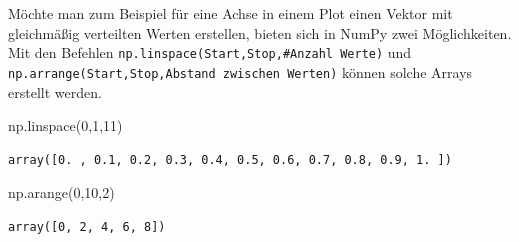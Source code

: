 \documentclass[
  letterpaper,
  DIV=11,
  numbers=noendperiod]{scrreprt}
\newenvironment{Shaded}{\begin{snugshade}}{\end{snugshade}}
\newcommand{\DecValTok}[1]{\textcolor[rgb]{0.68,0.00,0.00}{#1}}
\newcommand{\NormalTok}[1]{\textcolor[rgb]{0.00,0.23,0.31}{#1}}
\begin{document}
Möchte man zum Beispiel für eine Achse in einem Plot einen Vektor mit
gleichmäßig verteilten Werten erstellen, bieten sich in NumPy zwei
Möglichkeiten. Mit den Befehlen
\texttt{np.linspace(Start,Stop,\#Anzahl\ Werte)} und
\texttt{np.arrange(Start,Stop,Abstand\ zwischen\ Werten)} können solche
Arrays erstellt werden.

\begin{Shaded}
\begin{Highlighting}[]
\NormalTok{np.linspace(}\DecValTok{0}\NormalTok{,}\DecValTok{1}\NormalTok{,}\DecValTok{11}\NormalTok{)}
\end{Highlighting}
\end{Shaded}

\begin{verbatim}
array([0. , 0.1, 0.2, 0.3, 0.4, 0.5, 0.6, 0.7, 0.8, 0.9, 1. ])
\end{verbatim}

\begin{Shaded}
\begin{Highlighting}[]
\NormalTok{np.arange(}\DecValTok{0}\NormalTok{,}\DecValTok{10}\NormalTok{,}\DecValTok{2}\NormalTok{)}
\end{Highlighting}
\end{Shaded}

\begin{verbatim}
array([0, 2, 4, 6, 8])
\end{verbatim}
\end{document}
